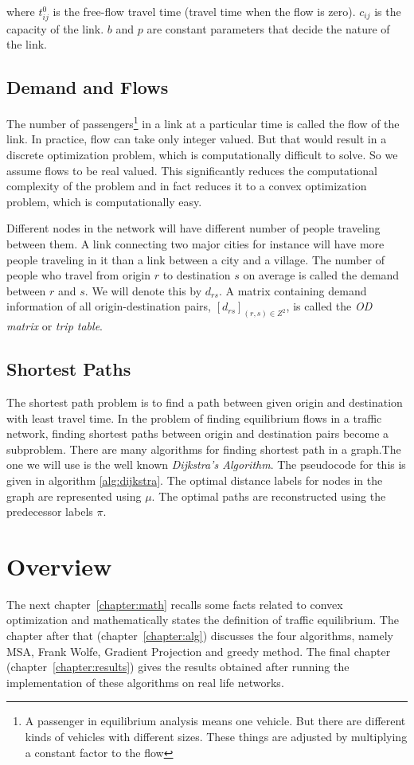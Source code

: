 where $t^0_{ij}$ is the free-flow travel time (travel time when the flow is zero). $c_{ij}$ is the capacity of the link. $b$ and $p$ are constant parameters that decide the nature of the link.

\subsection{Demand and Flows}
The number of passengers\footnote{A passenger in equilibrium analysis means one vehicle. But there are different kinds of vehicles	with different sizes. These things are adjusted by multiplying a constant factor to the flow} in a link at a particular time	is called the flow of the link. In practice, flow can take only integer valued. But that would result in a discrete optimization problem, which is computationally difficult to solve. So we assume flows to be real valued. This significantly reduces the computational	complexity of the problem and in fact reduces it to a convex optimization problem, which is computationally easy.

Different nodes in the network will have different number of people traveling between them. A link connecting two major cities for instance will have more people traveling in it	than a link between a city and a village. The number of people who travel from origin $r$ to destination $s$ on average is called the demand between $r$ and $s$. We will denote this by $d_{rs}$. A matrix containing demand information of all origin-destination pairs,
 $[d_{rs}]_{(r,s)\in Z^2}$,
is called the \emph{OD matrix} or \emph{trip table}.


\subsection{Shortest Paths}
The shortest path problem is to find a path between given origin and destination with least travel time. In the problem of finding equilibrium flows in a traffic network, finding shortest paths between origin and destination pairs become a subproblem. There are many algorithms for finding shortest path in a graph.The one we will use is the well known \emph{Dijkstra's Algorithm}. The pseudocode for this is given in algorithm \ref{alg:dijkstra}. The optimal distance labels for nodes in the graph are represented using $\mu$. The optimal paths are reconstructed using the predecessor labels $\pi$.
	


\section{Overview}
The next chapter~\ref{chapter:math} recalls some facts
related to convex optimization and mathematically states the definition of traffic equilibrium.
The chapter after that (chapter~\ref{chapter:alg}) discusses the four algorithms, namely MSA, Frank Wolfe, Gradient Projection and greedy method. The final chapter (chapter~\ref{chapter:results}) gives the results obtained after running the implementation of
these algorithms on real life networks.
